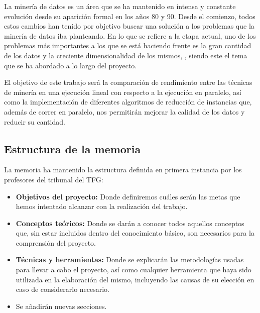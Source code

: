

La minería de datos es un área que se ha mantenido en intensa y constante evolución desde su aparición formal en los años 80 y 90. Desde el comienzo, todos estos cambios han tenido por objetivo buscar una solución a los problemas que la minería de datos iba planteando. En lo que se refiere a la etapa actual, uno de los problemas más importantes a los que se está haciendo frente es la gran cantidad de los datos y la creciente dimensionalidad de los mismos, \cite{DataMiningConcepts}, siendo este el tema que se ha abordado a lo largo del proyecto.

El objetivo de este trabajo será la comparación de rendimiento entre las técnicas de minería en una ejecución lineal con respecto a la ejecución en paralelo, así como la implementación de diferentes algoritmos de reducción de instancias que, además de correr en paralelo, nos permitirán mejorar la calidad de los datos y reducir su cantidad.

\subsection{Estructura de la memoria}
	La memoria ha mantenido la estructura definida en primera instancia por los profesores del tribunal del TFG:
	\begin{itemize}
	\item \textbf{Objetivos del proyecto:} Donde definiremos cuáles serán las metas que hemos intentado alcanzar con la realización del trabajo.
	\item \textbf{Conceptos teóricos:} Donde se darán a conocer todos aquellos conceptos que, sin estar incluidos dentro del conocimiento básico, son necesarios para la comprensión del proyecto.
	\item \textbf{Técnicas y herramientas:} Donde se explicarán las metodologías usadas para llevar a cabo el proyecto, así como cualquier herramienta que haya sido utilizada en la elaboración del mismo, incluyendo las causas de su elección en caso de considerarlo necesario.
	\item Se añadirán nuevas secciones.
	\end{itemize}

